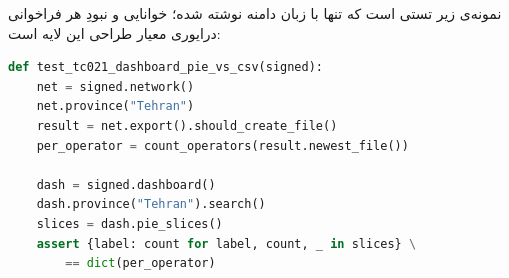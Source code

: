 نمونه‌ی زیر تستی است که تنها با زبان دامنه نوشته شده؛ خوانایی و نبودِ هر فراخوانی درایوری معیار طراحی این لایه است:

\begin{latin}
\begin{lstlisting}[language=Python]
def test_tc021_dashboard_pie_vs_csv(signed):
    net = signed.network()
    net.province("Tehran")
    result = net.export().should_create_file()
    per_operator = count_operators(result.newest_file())

    dash = signed.dashboard()
    dash.province("Tehran").search()
    slices = dash.pie_slices()
    assert {label: count for label, count, _ in slices} \
        == dict(per_operator)
\end{lstlisting}
\end{latin}